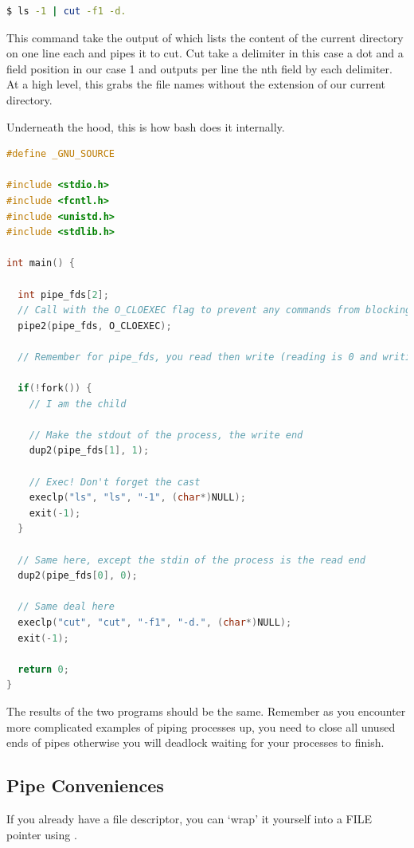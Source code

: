 \begin{lstlisting}[language=bash]
$ ls -1 | cut -f1 -d.
\end{lstlisting}

This command take the output of  which lists the content of the current directory on one line each and pipes it to cut.
Cut take a delimiter in this case a dot and a field position in our case 1 and outputs per line the nth field by each delimiter.
At a high level, this grabs the file names without the extension of our current directory.

Underneath the hood, this is how bash does it internally.

\begin{lstlisting}[language=C]
#define _GNU_SOURCE

#include <stdio.h>
#include <fcntl.h>
#include <unistd.h>
#include <stdlib.h>

int main() {

  int pipe_fds[2];
  // Call with the O_CLOEXEC flag to prevent any commands from blocking
  pipe2(pipe_fds, O_CLOEXEC);

  // Remember for pipe_fds, you read then write (reading is 0 and writing is 1)

  if(!fork()) {
    // I am the child

    // Make the stdout of the process, the write end
    dup2(pipe_fds[1], 1);

    // Exec! Don't forget the cast
    execlp("ls", "ls", "-1", (char*)NULL);
    exit(-1);
  }

  // Same here, except the stdin of the process is the read end
  dup2(pipe_fds[0], 0);

  // Same deal here
  execlp("cut", "cut", "-f1", "-d.", (char*)NULL);
  exit(-1);

  return 0;
}
\end{lstlisting}

The results of the two programs should be the same.
Remember as you encounter more complicated examples of piping processes up, you need to close all unused ends of pipes otherwise you will deadlock waiting for your processes to finish.

\subsection{Pipe Conveniences}

If you already have a file descriptor, you can `wrap' it yourself into a FILE pointer using .

